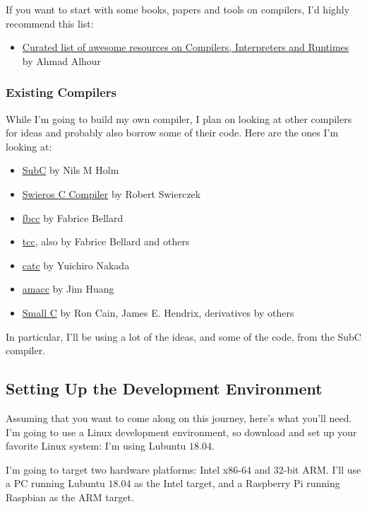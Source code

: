 \documentclass[journal, onecolumn, 12pt]{IEEEtran}
\begin{document}
If you want to start with some books, papers and tools on compilers, I'd highly recommend this list:

\begin{itemize}
    \item \href{https://github.com/aalhour/awesome-compilers}{Curated list of awesome resources on Compilers, Interpreters and Runtimes} by Ahmad Alhour
\end{itemize}

\subsubsection{Existing Compilers}

While I'm going to build my own compiler, I plan on looking at other compilers for ideas and probably also borrow some of their code. Here are the ones I'm looking at:

\begin{itemize}
    \item \href{http://www.t3x.org/subc/}{SubC} by Nils M Holm
    \item \href{https://github.com/rswier/swieros/blob/master/root/bin/c.c}{Swieros C Compiler} by Robert Swierczek
    \item \href{https://github.com/DoctorWkt/fbcc}{fbcc} by Fabrice Bellard
    \item \href{https://bellard.org/tcc}{tcc}, also by Fabrice Bellard and others
    \item \href{https://github.com/yui0/catc}{catc}  by Yuichiro Nakada
    \item \href{https://github.com/jserv/amacc}{amacc} by Jim Huang
    \item \href{https://en.wikipedia.org/wiki/Small-C}{Small C} by Ron Cain, James E. Hendrix, derivatives by others
\end{itemize}

In particular, I'll be using a lot of the ideas, and some of the code, from the SubC compiler.

\subsection{Setting Up the Development Environment}

Assuming that you want to come along on this journey, here's what you'll need. I'm going to use a Linux development environment, so download and set up your favorite Linux system: I'm using Lubuntu $18.04$.

I'm going to target two hardware platforms: Intel x86-64 and 32-bit ARM. I'll use a PC running Lubuntu $18.04$ as the Intel target, and a Raspberry Pi running Raspbian as the ARM target.
\end{document}

